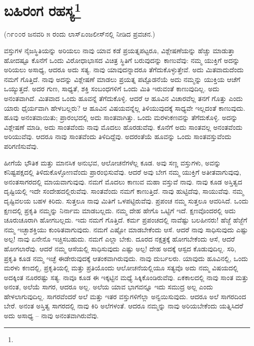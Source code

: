 
\chapter[ಬಹಿರಂಗ ರಹಸ್ಯ]{ಬಹಿರಂಗ ರಹಸ್ಯ\protect\footnote{}}

\begin{center}
(೧೯೦೦ರ ಜನವರಿ ೫ ರಂದು ಲಾಸ್‌ಏಂಜಲೀಸ್‌ನಲ್ಲಿ ನೀಡಿದ ಪ್ರವಚನ.)
\end{center}

ವಸ್ತುಗಳ ನೈಜಸ್ಥಿತಿಯನ್ನು ಅರಿಯಲು ನಾವು ಯಾವ ಕಡೆ ಪ್ರಯತ್ನಪಟ್ಟರೂ, ವಿಶ್ಲೇಷಣೆಯನ್ನು ಹೆಚ್ಚು ಮಾಡುತ್ತಾ ಹೋದಷ್ಟೂ ಕೊನೆಗೆ ಒಂದು ವಿರೋಧಾಭಾಸದ ವಿಚಿತ್ರ ಸ್ಥಿತಿಗೆ ಬರುವುದನ್ನು ಕಾಣುವೆವು: ನಮ್ಮ ಯುಕ್ತಿಗೆ ಅದನ್ನು ಅರಿಯಲು ಅಸಾಧ್ಯ, ಆದರೂ ಅದು ಸತ್ಯ. ನಾವು ಯಾವುದನ್ನಾದರೂ ತೆಗೆದುಕೊಳ್ಳುತ್ತೇವೆ. ಅದು ಮಿತವಾದುದೆಂದು ನಮಗೆ ಗೊತ್ತಿದೆ. ನಾವು ಅದನ್ನು ವಿಶ್ಲೇಷಣೆ ಮಾಡಲು ಪ್ರಯತ್ನ ಪಟ್ಟೊಡನೆಯೆ ಅದು ನಮ್ಮನ್ನು ಯುಕ್ತಿಯ ಆಚೆಗೆ ಒಯ್ಯುತ್ತದೆ. ಅದರ ಗುಣ, ಸಾಧ್ಯತೆ, ಶಕ್ತಿ ಸಂಬಂಧಗಳಿಗೆ ಒಂದು ಮಿತಿ ಇರುವಂತೆ ಕಾಣುವುದಿಲ್ಲ. ಅದು ಅನಂತವಾಗಿದೆ. ಮಿತವಾದ ಒಂದು ಹೂವನ್ನೆ ತೆಗೆದುಕೊಳ್ಳಿ. ಆದರೆ ಆ ಹೂವಿನ ವಿಚಾರವೆಲ್ಲ ತನಗೆ ಗೊತ್ತು ಎಂದು ಯಾರು ಧೈರ್ಯವಾಗಿ ಹೇಳಬಲ್ಲರು? ಆ ಹೂವಿನ ವಿಷಯವನ್ನೆಲ್ಲ ತಿಳಿಯುವುದಕ್ಕೆ ಸಾಧ್ಯವೇ ಇಲ್ಲದಂತೆ ಕಾಣುವುದು. ಹೂವು ಅನಂತವಾಯಿತು; ಪ್ರಾರಂಭದಲ್ಲಿ ಅದು ಸಾಂತವಾಗಿತ್ತು. ಒಂದು ಮರಳುಕಣವನ್ನು ತೆಗೆದುಕೊಳ್ಳಿ. ಅದನ್ನು ವಿಶ್ಲೇಷಣೆ ಮಾಡಿ, ಅದು ಸಾಂತವೆಂದು ನಾವು ಮೊದಲು ಹೊರಡುವೆವು. ಕೊನೆಗೆ ಅದು ಸಾಂತವಲ್ಲ ಅನಂತವೆಂದು ಅರಿಯುವೆವು. ಆದರೂ ನಾವು ಸಾಂತವೆಂದು ತಿಳಿದಿದ್ದೆವು. ಅದರಂತೆಯೆ ಹೂವನ್ನು ಒಂದು ಸಾಂತವಸ್ತುವೆಂದು ಪರಿಗಣಿಸುವೆವು.

ಹೀಗೆಯೆ ಭೌತಿಕ ಮತ್ತು ಮಾನಸಿಕ ಅನುಭವ, ಆಲೋಚನೆಗಳೆಲ್ಲ ಕೂಡ. ಅವು ಸಣ್ಣ ವಸ್ತುಗಳು, ಅವನ್ನು ಕನಿಷ್ಟಪಕ್ಷದಲ್ಲಿ ತಿಳಿದುಕೊಳ್ಳೋಣವೆಂದು ಪ್ರಾರಂಭಿಸುವೆವು. ಆದರೆ ಅವು ಬೇಗ ನಮ್ಮ ಯುಕ್ತಿಗೆ ಅತೀತವಾಗುವುವು, ಅನಂತಸಾಗರದಲ್ಲಿ ಮಾಯವಾಗುವುವು. ನಮಗೆ ಮೊದಲು ಕಾಣುವ ಮಹಾ ವಸ್ತುವೆ ನಾವು. ನಾವು ಕೂಡ ಅಸ್ತಿತ್ವದ ದೃಷ್ಟಿಯಲ್ಲಿ ಇದೇ ಸಂದೇಹದಲ್ಲಿರುವೆವು. ಸಾಂತವೆಂದು ನಮಗೆ ಕಾಣುತ್ತಿದೆ. ನಾವು ಹುಟ್ಟಿದೆವು, ಸಾಯುವೆವು. ನಮ್ಮ ದೃಷ್ಟಿವಲಯ ಬಹಳ ಕಿರಿದು. ಸುತ್ತಲೂ ನಾವು ಮಿತಿಗೆ ಒಳಪಟ್ಟಿರುವೆವು. ಪ್ರಪಂಚ ನಮ್ಮ ಸುತ್ತಲೂ ಆವರಿಸಿದೆ. ಒಂದು ಕ್ಷಣದಲ್ಲಿ ಪ್ರಕೃತಿ ನಮ್ಮನ್ನು ನಿರ್ನಾಮ ಮಾಡಬಲ್ಲದು. ನಮ್ಮ ದೇಹ ಹೇಗೊ ಒಟ್ಟಿಗೆ ಇದೆ. ಕ್ಷಣವೊಂದರಲ್ಲಿ ಅದು ಚೂರುಚೂರಾಗಿ ಹೋಗಬಲ್ಲದು. ಇದು ನಮಗೆ ಗೊತ್ತಿದೆ. ಕರ್ಮ ಪ್ರಪಂಚದಲ್ಲಿ ನಾವೆಷ್ಟು ಬಲಹೀನರು! ಹೆಜ್ಜೆ ಹೆಜ್ಜೆಗೆ ನಮ್ಮ ಇಚ್ಛಾಶಕ್ತಿಯು ಕುಂಠಿತವಾಗುವುದು. ನಮಗೆ ಎಷ್ಟೋ ಮಾಡಬೇಕೆಂದು ಆಸೆ. ಆದರೆ ನಾವು ಸಾಧಿಸುವುದು ಎಷ್ಟು ಅಲ್ಪ! ನಾವು ಏನೇನೊ ಇಚ್ಚಿಸಬಹುದು. ನಮಗೆ ಎಲ್ಲಾ ಬೇಕು. ದೂರದ ನಕ್ಷತ್ರಕ್ಕೆ ಹೋಗಬೇಕೆಂದು ಆಸೆ, ಆದರೆ ಹೋಗಲಾರೆವು. ಆದರೆ ನಮ್ಮ ಆಸೆಯಲ್ಲಿ ಸಾಧಿಸುವುದು ಎಷ್ಟು ಅಲ್ಪ! ದೇಹ ಅದಕ್ಕೆ ಆಸ್ಪದ ಕೊಡುವುದಿಲ್ಲ. ಸರಿ, ಪ್ರಕೃತಿ ಕೂಡ ನಮ್ಮ ಇಚ್ಛೆ ಈಡೇರುವುದಕ್ಕೆ ಆತಂಕವಾಗಿರುವುದು. ನಾವು ದುರ್ಬಲರು. ಯಾವುದು ಹೂವಿನಲ್ಲಿ, ಒಂದು ಮರಳು ಕಣದಲ್ಲಿ, ಪ್ರಕೃತಿಯಲ್ಲಿ ಮತ್ತು ಪ್ರತಿಯೊಂದು ಆಲೋಚನೆಯಲ್ಲಿಯೂ ಸತ್ಯವೊ ಅದು ನಮ್ಮ ವಿಷಯದಲ್ಲಿ ಅದಕ್ಕಿಂತ ನೂರರಷ್ಟು ಸತ್ಯ. ನಾವೂ ಕೂಡ ಈ ಇಕ್ಕಟ್ಟಿನ ಮಧ್ಯೆ ಸಿಕ್ಕಿಕೊಂಡಿರುವೆವು. ಏಕಕಾಲದಲ್ಲಿ ನಾವು ಸಾಂತ ಮತ್ತು ಅನಂತ, ಅಲೆಯೆ ಸಾಗರ, ಆದರೂ ಅಲ್ಲ. ಅಲೆಯ ಯಾವ ಭಾಗವನ್ನೂ ಇದು ಸಮುದ್ರ ಅಲ್ಲ ಎಂದು ಹೇಳಲಾಗುವುದಿಲ್ಲ. ಸಾಗರವೆಂದರೆ ಅಲೆ ಮತ್ತು ಇತರ ವಸ್ತುಗಳಿಗೆಲ್ಲಾ ಅನ್ವಯಿಸುವುದು. ಆದರೂ ಅಲೆ ಸಾಗರದಿಂದ ಬೇರೆ. ಅನಂತ ಅಸ್ತಿತ್ವ ಸಾಗರದಲ್ಲಿ ನಾವು ಕಿರಿ ಅಲೆಗಳಂತೆ. ಆದರೂ ನಮ್ಮನ್ನು ನಾವು ಅರಿಯಬೇಕೆಂದು ಯತ್ನಿಸಿದರೆ ಅದು ಅಸಾಧ್ಯ – ನಾವು ಅನಂತವಾಗಿರುವೆವು.

